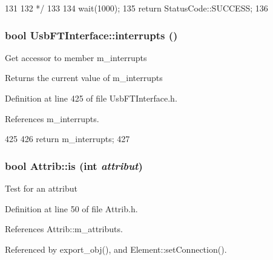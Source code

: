 \begin{DoxyCode}
{{{131     }
132 */
133   }
134   wait(1000);
135   return StatusCode::SUCCESS;
136 }
\end{DoxyCode}
\hypertarget{classUsbFTInterface_a1831ba02d9707ded902af4cb1df8863f}{
\subsubsection[{interrupts}]{\setlength{\rightskip}{0pt plus 5cm}bool UsbFTInterface::interrupts ()}}
\label{classUsbFTInterface_a1831ba02d9707ded902af4cb1df8863f}
Get accessor to member m\_\-interrupts \begin{DoxyReturn}{Returns}
the current value of m\_\-interrupts 
\end{DoxyReturn}


Definition at line 425 of file UsbFTInterface.h.

References m\_\-interrupts.


\begin{DoxyCode}
425                      {
426     return m_interrupts;
427   }
\end{DoxyCode}
\hypertarget{classAttrib_a704f26af560909ad22065083bb7d4c34}{
\subsubsection[{is}]{\setlength{\rightskip}{0pt plus 5cm}bool Attrib::is (int {\em attribut})}}
\label{classAttrib_a704f26af560909ad22065083bb7d4c34}
Test for an attribut 

Definition at line 50 of file Attrib.h.

References Attrib::m\_\-attributs.

Referenced by export\_\-obj(), and Element::setConnection().



